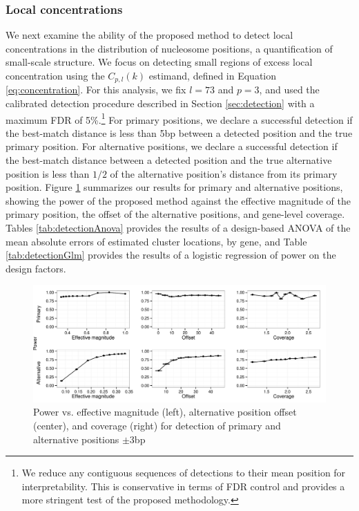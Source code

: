 \subsubsection{Local concentrations}
\label{sec:localPower}

We next examine the ability of the proposed method to detect local concentrations in the distribution of nucleosome positions, a quantification of small-scale structure.
We focus on detecting small regions of excess local concentration using the $C_{p,l}(k)$ estimand, defined in Equation \ref{eq:concentration}.
For this analysis, we fix $l = 73$ and $p = 3$, and used the calibrated detection procedure described in Section \ref{sec:detection} with a maximum FDR of 5\%.\footnote{We reduce any contiguous sequences of detections to their mean position for interpretability. This is conservative in terms of FDR control and provides a more stringent test of the proposed methodology.}
%
For primary positions, we declare a successful detection if the best-match distance is less than 5bp between a detected position and the true primary position.
For alternative positions, we declare a successful detection if the best-match distance between a detected position and the true alternative position is less than $1/2$ of the alternative position's distance from its primary position.
%
Figure \ref{fig:powerLocal} summarizes our results for primary and alternative positions, showing the power of the proposed method against the effective magnitude of the primary position, the offset of the alternative positions, and gene-level coverage.
Tables \ref{tab:detectionAnova} provides the results of a design-based ANOVA of the mean absolute errors of  estimated cluster locations, by gene, and Table \ref{tab:detectionGlm} provides the results of a logistic regression of power on the design factors.
%
\ifx\nofigures\undefined
\begin{figure}
\centering
\includegraphics[width=\textwidth]{figures/nucleosomes/figure_power_combined-pm3_3-panel}
\caption{Power vs. effective magnitude (left), alternative position offset (center), and coverage (right) for detection of primary and alternative positions $\pm 3$bp \label{fig:powerLocal}}
\end{figure}

